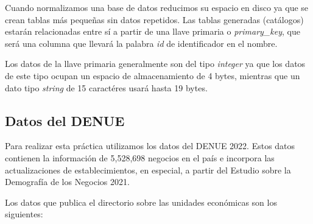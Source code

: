 \documentclass{article}
\begin{document}
Cuando normalizamos una base de datos reducimos su espacio en disco ya que se
crean tablas más pequeñas sin datos repetidos. Las tablas generadas (catálogos)
estarán relacionadas entre sí a partir de una llave primaria o
\textit{primary\_key}, que será una columna que llevará la palabra
\textit{id} de identificador en el nombre. 

Los datos de la llave primaria generalmente son del tipo \textit{integer} ya que
los datos de este tipo ocupan un espacio de almacenamiento de 4 bytes, mientras
que un dato tipo \textit{string} de 15 caractéres usará hasta 19 bytes.

\subsection{Datos del DENUE}

Para realizar esta práctica utilizamos los datos del DENUE 2022. Estos datos
contienen la información de 5,528,698 negocios en el país e incorpora las
actualizaciones de establecimientos, en especial, a partir del Estudio sobre la
Demografía de los Negocios 2021.

Los datos que publica el directorio sobre las unidades económicas son los
siguientes:
\end{document}
